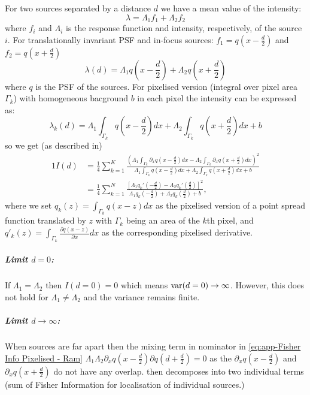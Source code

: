 For two sources separated by a distance $d$ we have a mean value of the intensity:
%
\begin{equation}
	\lambda=\Lambda_1f_1+\Lambda_2f_2
\end{equation}
%
where $f_i$ and $\Lambda_i$ is the response function and intensity, respectively, of the source $i$. For translationally invariant PSF and in-focus sources: $f_1=q(x-\frac{d}{2})$ and $f_2=q(x+\frac{d}{2})$
%
\begin{equation}
	\lambda(d)=\Lambda_1q(x-\frac{d}{2})+\Lambda_2q(x+\frac{d}{2})
\end{equation}
%
where $q$ is the PSF of the sources. For pixelised version (integral over pixel area $\Gamma_k$) with homogeneous bacground $b$ in each pixel the intensity can be expressed as:
%
\begin{equation}
	\lambda_k(d)=\Lambda_1\int_{\Gamma_k}q(x-\frac{d}{2})dx+\Lambda_2\int_{\Gamma_k}q(x+\frac{d}{2})dx+b
\end{equation}
%
so we get (as described in\cite{Ram2006})
%
\begin{alignat}{1}
	I(d)
	&=\frac{1}{4}\sum_{k=1}^K\frac{\left(\Lambda_1\int_{\Gamma_k}\partial_{x}q(x-\frac{d}{2})dx-\Lambda_2\int_{\Gamma_k}\partial_{x}q(x+\frac{d}{2})dx\right)^2}{\Lambda_1\int_{\Gamma_k}q(x-\frac{d}{2})dx+\Lambda_2\int_{\Gamma_k}q(x+\frac{d}{2})dx+b}\nonumber\\
	&=\frac{1}{4}\sum_{k=1}^N\frac{\left[\Lambda_1q_k'(-\frac{d}{2})-\Lambda_2q_k'(\frac{d}{2})\right]^2}{\Lambda_1q_k(-\frac{d}{2})+\Lambda_2q_k(\frac{d}{2})+b},
	\label{eq:app-Fisher Info Pixelised - Ram}	
\end{alignat}
%
where we set $q_k(z)=\int_{\Gamma_k}q(x-z)dx$ as the pixelised version of a point spread function translated by $z$ with $\Gamma_k$ being an area of the $k$th pixel, and $q'_k(z)=\int_{\Gamma_k}\frac{\partial q(x-z)}{\partial x}dx$ as the corresponding pixelised derivative.


\subparagraph*{Limit $d=0$:}
If $\Lambda_1=\Lambda_2$ then $I(d=0)=0$ which means $\mathrm{var}(d=0)\rightarrow\infty$. However, this does not hold for $\Lambda_1\neq\Lambda_2$ and the variance remains finite.

\subparagraph*{Limit $d\rightarrow\infty$:}
When sources are far apart then the mixing term in nominator in \autoref{eq:app-Fisher Info Pixelised - Ram} $\Lambda_1\Lambda_2\partial_{x}q(x-\frac{d}{2})\partial q(d+\frac{d}{2})=0$ as the $\partial_{x}q(x-\frac{d}{2})$ and $\partial_{x}q(x+\frac{d}{2})$ do not have any overlap.  then decomposes into two individual terms (sum of Fisher Information for localisation of individual sources.) 


